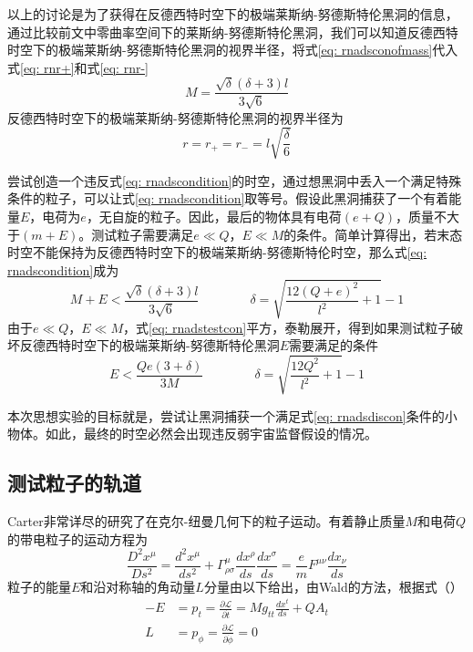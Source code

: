 以上的讨论是为了获得在反德西特时空下的极端莱斯纳-努德斯特伦黑洞的信息，通过比较前文中零曲率空间下的莱斯纳-努德斯特伦黑洞，我们可以知道反德西特时空下的极端莱斯纳-努德斯特伦黑洞的视界半径，将式\eqref{eq: rnadsconofmass}代入式\eqref{eq: rnr+}和式\eqref{eq: rnr-}
\begin{equation}\label{eq: rnadsconofmass}
    M=\frac{\sqrt{\delta } (\delta +3) l}{3 \sqrt{6}}
\end{equation}
反德西特时空下的极端莱斯纳-努德斯特伦黑洞的视界半径为
\begin{equation}\label{eq: rnadshorizonex}
    r=r_+=r_-=l\sqrt{\frac{\delta}{6}} 
\end{equation}

尝试创造一个违反式\eqref{eq: rnadscondition}的时空，通过想黑洞中丢入一个满足特殊条件的粒子，可以让式\eqref{eq: rnadscondition}取等号。假设此黑洞捕获了一个有着能量$E$，电荷为$e$，无自旋的粒子。因此，最后的物体具有电荷$\left(e+Q\right)$，质量不大于$\left(m+E\right)$。测试粒子需要满足$e\ll Q$，$E\ll M$的条件。简单计算得出，若末态时空不能保持为反德西特时空下的极端莱斯纳-努德斯特伦时空，那么式\eqref{eq: rnadscondition}成为
\begin{equation}\label{eq: rnadstestcon}
    M+E < \frac{\sqrt{\delta } (\delta +3) l}{3 \sqrt{6}} \quad\quad\quad\quad  \delta= \sqrt{\frac{12 \left(Q+e\right)^2}{l^2}+1}-1
\end{equation}
由于$e\ll Q$，$E\ll M$，式\eqref{eq: rnadstestcon}平方，泰勒展开，得到如果测试粒子破坏反德西特时空下的极端莱斯纳-努德斯特伦黑洞$E$需要满足的条件
\begin{equation}\label{eq: rnadsdiscon}
    E < \frac{Q e \left(3+\delta\right)}{3M} \qquad\qquad  \delta= \sqrt{\frac{12 Q^2}{l^2}+1}-1
\end{equation}

本次思想实验的目标就是，尝试让黑洞捕获一个满足式\eqref{eq: rnadsdiscon}条件的小物体。如此，最终的时空必然会出现违反弱宇宙监督假设的情况\citep{wald1974gedanken}。
\subsection{测试粒子的轨道}
Carter非常详尽的研究了在克尔-纽曼几何下的粒子运动\cite{carter1968global}。有着静止质量$M$和电荷$Q$的带电粒子的运动方程为
\begin{equation}
    \frac{D^2x^\mu}{D s^2}=\frac{d^2x^\mu}{ds^2}+\Gamma^{\mu}_{\rho\sigma }\frac{dx^\rho}{ds}\frac{dx^\sigma}{ds}=\frac{e}{m}F^{\mu\nu }\frac{dx_\nu}{ds}
\end{equation}
粒子的能量$E$和沿对称轴的角动量$L$分量由以下给出，由Wald的方法\cite{wald1974gedanken}，根据式（）
\begin{align}
    -E&=p_t=\frac{\partial \mathcal{L}}{\partial \dot{t}}=Mg_{tt}\frac{dx^t}{ds}+QA_t \\
    L&=p_\phi=\frac{\partial \mathcal{L}}{\partial \dot{\phi}}=0
\end{align}

